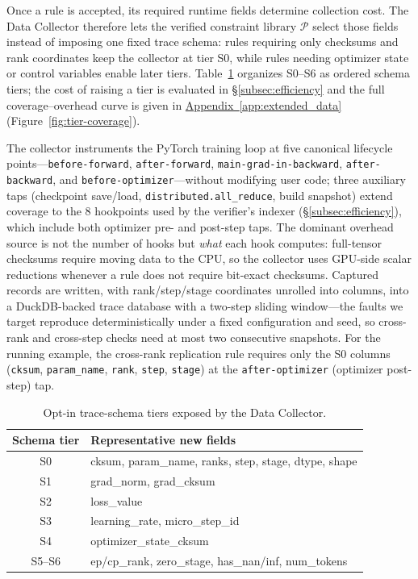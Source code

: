 \documentclass[sigconf,nonacm]{acmart}
\newcommand{\suppappendix}[1]{%
  \href{https://github.com/vivia-an/trainaudit-vldb-artifact/blob/vldb-2027-artifact-v1.0.1/paper/appendix_supplement.pdf}%
  {Appendix~\ref*{#1}}}
\begin{document}
Once a rule is accepted, its required runtime fields determine collection cost.
The Data Collector therefore lets the verified constraint library $\mathcal{P}$
select those fields instead of imposing one fixed trace schema: rules requiring
only checksums and rank coordinates keep the collector at tier S0, while rules
needing optimizer state or control variables enable later tiers.
Table~\ref{tab:trace-schema} organizes S0--S6 as ordered schema tiers; the cost
of raising a tier is evaluated in \S\ref{subsec:efficiency} and the full
coverage--overhead curve is given in \suppappendix{app:extended_data}
(Figure~\ref{fig:tier-coverage}).

{\sloppy The collector instruments the PyTorch training loop at five canonical lifecycle points---\texttt{before-\allowbreak forward}, \texttt{after-\allowbreak forward}, \texttt{main-\allowbreak grad-\allowbreak in-\allowbreak backward}, \texttt{after-\allowbreak backward}, and \texttt{before-\allowbreak optimizer}---without modifying user code; three auxiliary taps (checkpoint save/load, \texttt{distributed.all\_reduce}, build snapshot) extend coverage to the 8 hookpoints used by the verifier's indexer (\S\ref{subsec:efficiency}), which include both optimizer pre- and post-step taps. The dominant overhead source is not the number of hooks but \emph{what} each hook computes: full-tensor checksums require moving data to the CPU, so the collector uses GPU-side scalar reductions whenever a rule does not require bit-exact checksums. Captured records are written, with rank/step/stage coordinates unrolled into columns, into a DuckDB-backed trace database with a two-step sliding window---the faults we target reproduce deterministically under a fixed configuration and seed, so cross-rank and cross-step checks need at most two consecutive snapshots. For the running example, the cross-rank replication rule requires only the S0 columns (\texttt{cksum}, \texttt{param\_name}, \texttt{rank}, \texttt{step}, \texttt{stage}) at the \texttt{after-optimizer} (optimizer post-step) tap.\par}

\begin{table}[!t]
\small
{}
\caption{Opt-in trace-schema tiers exposed by the Data Collector.}
\label{tab:trace-schema}
\begin{tabularx}{\columnwidth}{@{}c >{\raggedright\arraybackslash}X@{}}
\toprule
\textbf{Schema tier} & \textbf{Representative new fields} \\
\midrule
S0 & cksum, param\_name, ranks, step, stage, dtype, shape \\
S1 & grad\_norm, grad\_cksum \\
S2 & loss\_value \\
S3 & learning\_rate, micro\_step\_id \\
S4 & optimizer\_state\_cksum \\
S5--S6 & ep/cp\_rank, zero\_stage, has\_nan/inf, num\_tokens \\
\bottomrule
\end{tabularx}
\end{table}
\end{document}

